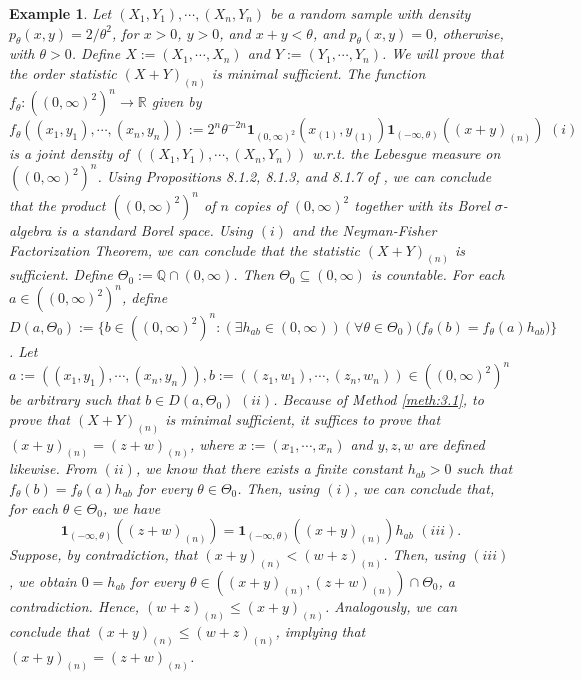 \documentclass[12pt]{article}
\newtheorem{example}{Example}[section]
\begin{document}
\begin{example}
\label{ex:4.4}
Let $(X_1,Y_1),\cdots, (X_n,Y_n)$ be a random sample with density $p_\theta (x,y)=2/\theta ^2$, for $x>0$, $y>0$, and $x+y<\theta$, and $p_\theta (x,y)=0$, otherwise, with $\theta >0$. Define $X:=(X_1,\cdots, X_n)$ and $Y:=(Y_1,\cdots, Y_n)$. We will prove that the order statistic $(X+Y)_{(n)}$ is minimal sufficient. The function $f_\theta :((0,\infty )^2)^n\to \mathbb{R}$ given by
$$f_\theta ((x_1,y_1),\cdots, (x_n,y_n)):=2^n\theta^{-2n}\mathbf{1}_{(0,\infty )^2}(x_{(1)},y_{(1)})\mathbf{1}_{(-\infty ,\theta )}((x+y)_{(n)})\,\,(i)$$
is a joint density of $((X_1,Y_1),\cdots, (X_n,Y_n))$ w.r.t. the Lebesgue measure on $((0,\infty )^2)^n$. Using Propositions 8.1.2, 8.1.3, and 8.1.7 of \cite{Cohn2013}, we can conclude that the product $((0,\infty )^2)^n$ of $n$ copies of $(0,\infty )^2$ together with its Borel $\sigma$-algebra is a standard Borel space. Using $(i)$ and the Neyman-Fisher Factorization Theorem, we can conclude that the statistic $(X+Y)_{(n)}$ is sufficient. Define $\Theta _0:=\mathbb{Q}\cap (0,\infty )$. Then $\Theta _0\subseteq (0,\infty )$ is countable. For each $a\in ((0,\infty )^2)^n$, define $D(a,\Theta _0):=\big\{b\in((0,\infty )^2)^n:(\exists h_{ab}\in (0,\infty ))(\forall \theta \in \Theta _0)\big(f_\theta (b)=f_\theta (a)h_{ab}\big)\big\}$.
Let $a:=((x_1,y_1),\cdots,(x_n,y_n)),b:=((z_1,w_1),\cdots,(z_n,w_n))\in ((0,\infty )^2)^n$ be arbitrary such that $b\in D(a,\Theta _0)\,\,(ii)$. Because of Method \ref{meth:3.1}, to prove that $(X+Y)_{(n)}$ is minimal sufficient, it suffices to prove that $(x+y)_{(n)}=(z+w)_{(n)}$, where $x:=(x_1,\cdots, x_n)$ and $y,z,w$ are defined likewise. From $(ii)$, we know that there exists a finite constant $h_{ab}>0$ such that $f_\theta (b)=f_\theta (a)h_{ab}$ for every $\theta\in\Theta _0$. Then, using $(i)$, we can conclude that, for each $\theta\in\Theta _0$, we have
$$\mathbf{1}_{(-\infty ,\theta )}((z+w)_{(n)})=\mathbf{1}_{(-\infty ,\theta )}((x+y)_{(n)})h_{ab}\,\,(iii).$$
Suppose, by contradiction, that $(x+y)_{(n)}<(w+z)_{(n)}$. Then, using $(iii)$, we obtain $0=h_{ab}$ for every $\theta \in ((x+y)_{(n)},(z+w)_{(n)})\cap \Theta _0$, a contradiction. Hence, $(w+z)_{(n)}\leq (x+y)_{(n)}$. Analogously, we can conclude that $(x+y)_{(n)}\leq (w+z)_{(n)}$, implying that $(x+y)_{(n)}=(z+w)_{(n)}$.
\end{example}
\end{document}
